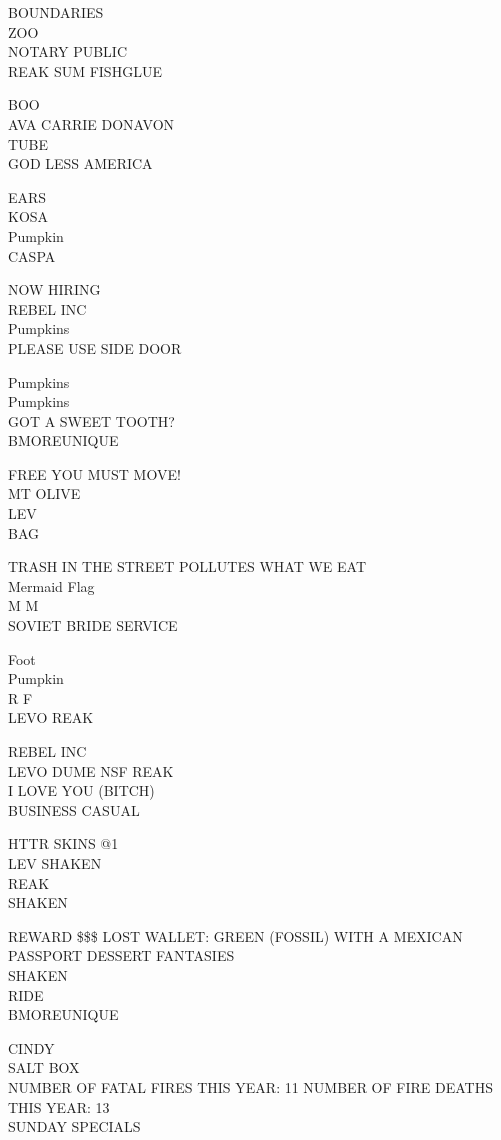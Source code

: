 \documentclass[10pt,letterpaper]{article}
\begin{document}
BOUNDARIES\\
ZOO\\
NOTARY PUBLIC\\
REAK SUM FISHGLUE

BOO\\
AVA CARRIE DONAVON\\
TUBE\\
GOD LESS AMERICA

EARS\\
KOSA\\
Pumpkin\\
CASPA

NOW HIRING\\
REBEL INC\\
Pumpkins\\
PLEASE USE SIDE DOOR

Pumpkins\\
Pumpkins\\
GOT A SWEET TOOTH?\\
BMOREUNIQUE

FREE YOU MUST MOVE!\\
MT OLIVE\\
LEV\\
BAG

TRASH IN THE STREET POLLUTES WHAT WE EAT\\
Mermaid Flag\\
M M\\
SOVIET BRIDE SERVICE

Foot\\
Pumpkin\\
R F\\
LEVO REAK

REBEL INC\\
LEVO DUME NSF REAK\\
I LOVE YOU (BITCH)\\
BUSINESS CASUAL

HTTR SKINS @1\\
LEV SHAKEN\\
REAK\\
SHAKEN

REWARD \$\$\$ LOST WALLET: GREEN (FOSSIL) WITH A MEXICAN PASSPORT DESSERT FANTASIES\\
SHAKEN\\
RIDE\\
BMOREUNIQUE

CINDY\\
SALT BOX\\
NUMBER OF FATAL FIRES THIS YEAR: 11 NUMBER OF FIRE DEATHS THIS YEAR: 13\\
SUNDAY SPECIALS
\end{document}
